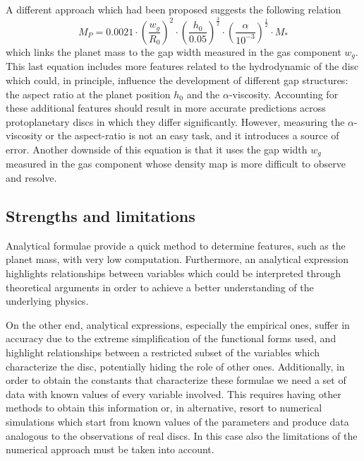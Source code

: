\documentclass[a4paper,10pt]{report}
\begin{document}
A different approach which had been proposed suggests the following relation
\begin{equation}
    M_P = 0.0021 \cdot \left( \frac{w_g}{R_0}\right)^2
    \cdot \left(\frac{h_0}{0.05}\right)^{\frac 32}
    \cdot \left(\frac{\alpha}{10^{-3}}\right)^{\frac 12}
    \cdot M_*
\end{equation}
which links the planet mass to the gap width measured in the gas component $w_g$.
This last equation includes more features related to the hydrodynamic of the disc which could, in principle,
influence the development of different gap structures: the aspect ratio at the planet position
$h_0$ and the $\alpha$-viscosity. Accounting for these additional features should result in more accurate predictions
across protoplanetary discs in which they differ significantly. However, measuring the $\alpha$-viscosity or the aspect-ratio 
is not an easy task, and it introduces a source of error.
Another downside of this equation is that it uses the gap width $w_g$ measured in the gas component 
whose density map is more difficult to observe and resolve.

\subsection{Strengths and limitations}

Analytical formulae provide a quick method to determine features, such as the planet mass, with 
very low computation. Furthermore, an analytical expression highlights relationships between variables
which could be interpreted through theoretical arguments in order to achieve a better understanding 
of the underlying physics.

On the other end, analytical expressions, especially the empirical ones, suffer in accuracy due to 
the extreme simplification of the functional forms used, and highlight relationships between a restricted subset of
the variables which characterize the disc, potentially hiding the role of other ones.
Additionally, in order to obtain the constants that characterize these formulae we need a set of
data with known values of every variable involved. This requires having other methods to obtain this information
or, in alternative, resort to numerical simulations which start from known values of the parameters and produce
data analogous to the observations of real discs. In this case also the limitations of the numerical approach must be taken 
into account.

\end{document}
